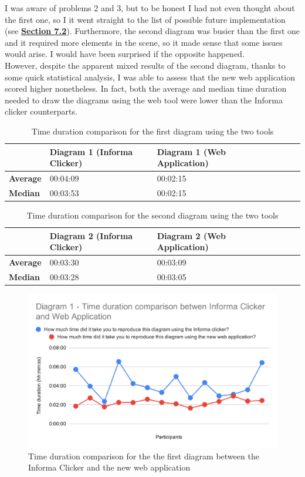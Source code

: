 \documentclass[]{usiinfbachelorproject}
\begin{document}
\noindent I was aware of problems 2 and 3, but to be honest I had not even thought about the first one, so I it went straight to the list of possible future implementation (see \hyperref[future work]{\textbf{Section 7.2}}). Furthermore, the second diagram was busier than the first one and it required more elements in the scene, so it made sense that some issues would arise. I would have been surprised if the opposite happened.\\
However, despite the apparent mixed results of the second diagram, thanks to some quick statistical analysis, I was able to assess that the new web application scored higher nonetheless. In fact, both the average and median time duration needed to draw the diagrams using the web tool were lower than the Informa clicker counterparts.

\bigskip

\begin{table}[h!]
\centering
\begin{tabular}{|l|l|l|l|l|l|l|}
\hline
 & \textbf{Diagram 1 (Informa Clicker)} & \textbf{Diagram 1 (Web Application)} \\ \hline
\textbf{Average} & 00:04:09 & 00:02:15 \\ \hline
\textbf{Median} & 00:03:53 & 00:02:15 \\ \hline
\end{tabular}
\caption{Time duration comparison for the first diagram using the two tools}
\end{table}

\begin{table}[h!]
\centering
\begin{tabular}{|l|l|l|l|l|l|l|}
\hline
 & \textbf{Diagram 2 (Informa Clicker)} & \textbf{Diagram 2 (Web Application)} \\ \hline
\textbf{Average} & 00:03:30 & 00:03:09 \\ \hline
\textbf{Median} & 00:03:28 & 00:03:05 \\ \hline
\end{tabular}
\caption{Time duration comparison for the second diagram using the two tools}
\end{table}

\begin{figure}[h!]
\centering
\includegraphics[scale=0.7]{figures/diagram1-time-comparison.png}
\caption {Time duration comparison for the the first diagram between the Informa Clicker and the new web application}
\end{figure}
\end{document}
